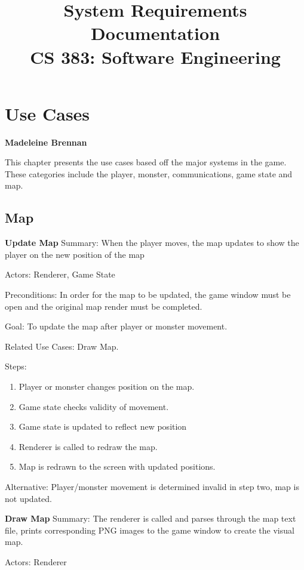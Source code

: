 \documentclass[12pt]{report}
\begin{document}
\title{System Requirements Documentation\\ \vspace{2 mm} {\large CS 383: Software Engineering}}
\maketitle
\clearpage

\chapter{Use Cases}
\textbf{Madeleine Brennan}

This chapter presents the use cases based off the major systems in the game. These categories
include the player, monster, communications, game state and map.

\section{Map}

\textbf{Update Map}
Summary: When the player moves, the map updates to show the player on the new position of the map

Actors:
Renderer, Game State

Preconditions: In order for the map to be updated, the game window must
be open and the original map render must be completed.

Goal: To update the map after player or monster movement.

Related Use Cases: Draw Map.
	
Steps: 
\begin{enumerate}
	\item Player or monster changes position on the map.
	\item Game state checks validity of movement.
	\item Game state is updated to reflect new position
	\item Renderer is called to redraw the map.
	\item Map is redrawn to the screen with updated positions.
\end{enumerate}
	
Alternative: Player/monster movement is determined invalid in step two, map is not updated.

\textbf{Draw Map}
Summary: The renderer is called and parses through the map text file, prints corresponding PNG images to the game window to create the visual map.

Actors: Renderer
\end{document}
